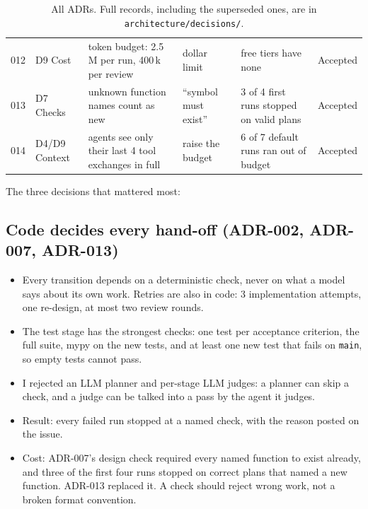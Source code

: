 \documentclass[11pt,a4paper]{article}
\newcommand{\code}[1]{\texttt{#1}}
\begin{document}
\begin{table}[H]
\begin{tabularx}{\linewidth}{@{}l l Y Y Y l@{}}
012 & D9 Cost & token budget: 2.5\,M per run, 400\,k per review & dollar limit & free tiers have none & Accepted \\
013 & D7 Checks & unknown function names count as new & ``symbol must exist'' & 3 of 4 first runs stopped on valid plans & Accepted \\
014 & D4/D9 Context & agents see only their last 4 tool exchanges in full & raise the budget & 6 of 7 default runs ran out of budget & Accepted \\
\bottomrule
\end{tabularx}
\caption{All ADRs. Full records, including the superseded ones, are in \code{architecture/decisions/}.}
\end{table}

The three decisions that mattered most:

\subsection{Code decides every hand-off (ADR-002, ADR-007, ADR-013)}
\begin{itemize}
  \item Every transition depends on a deterministic check, never on what a model says about its own
        work. Retries are also in code: 3 implementation attempts, one re-design, at most two review rounds.
  \item The test stage has the strongest checks: one test per acceptance criterion, the full suite, mypy on
        the new tests, and at least one new test that fails on \code{main}, so empty tests cannot pass.
  \item I rejected an LLM planner and per-stage LLM judges: a planner can skip a check, and a judge can be
        talked into a pass by the agent it judges.
  \item Result: every failed run stopped at a named check, with the reason posted on the issue.
  \item Cost: ADR-007's design check required every named function to exist already, and three of the
        first four runs stopped on correct plans that named a new function. ADR-013 replaced it. A check
        should reject wrong work, not a broken format convention.
\end{itemize}
\end{document}
